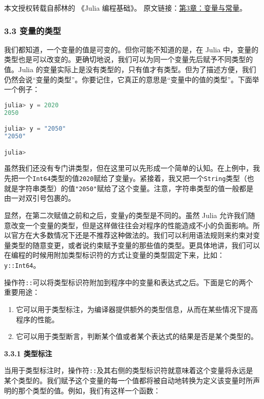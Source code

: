 
本文授权转载自郝林的 《Julia 编程基础》。 原文链接：\href{https://github.com/hyper0x/JuliaBasics/blob/master/book/ch03.md}{第3章：变量与常量}。


\subsubsection{3.3 变量的类型}

我们都知道，一个变量的值是可变的。但你可能不知道的是，在 Julia 中，变量的类型也是可以改变的。更确切地说，我们可以为同一个变量先后赋予不同类型的值。Julia 的变量实际上是没有类型的，只有值才有类型。但为了描述方便，我们仍然会说“变量的类型”。你要记住，它真正的意思是“变量中的值的类型”。下面举一个例子：

\begin{lstlisting}[language=julia]
julia> y = 2020
2050

julia> y = "2050"
"2050"

julia> 
\end{lstlisting}

虽然我们还没有专门讲类型，但在这里可以先形成一个简单的认知。在上例中，我先把一个\verb|Int64|类型的值\verb|2020|赋给了变量\verb|y|。紧接着，我又把一个\verb|String|类型（也就是字符串类型）的值\verb|"2050"|赋给了这个变量。注意，字符串类型的值一般都是由一对双引号包裹的。

显然，在第二次赋值之前和之后，变量\verb|y|的类型是不同的。虽然 Julia 允许我们随意改变一个变量的类型，但是这样做往往会对程序的性能造成不小的负面影响。所以官方在大多数情况下还是不推荐这种做法的。我们可以利用语法规则来约束对变量类型的随意变更，或者说约束赋予变量的那些值的类型。更具体地讲，我们可以在编程的时候用附加类型标识符的方式让变量的类型固定下来，比如：\verb|y::Int64|。

操作符\verb|::|可以将类型标识符附加到程序中的变量和表达式之后。下面是它的两个重要用途：

\begin{enumerate}
\item 它可以用于类型标注，为编译器提供额外的类型信息，从而在某些情况下提高程序的性能。
\item 它可以用于类型断言，判断某个值或者某个表达式的结果是否是某个类型的。
\end{enumerate}

\textbf{3.3.1 类型标注}

当用于类型标注时，操作符\verb|::|及其右侧的类型标识符就意味着这个变量将永远是某个类型的。我们赋予这个变量的每一个值都将被自动地转换为定义该变量时所声明的那个类型的值。例如，我们有这样一个函数：

